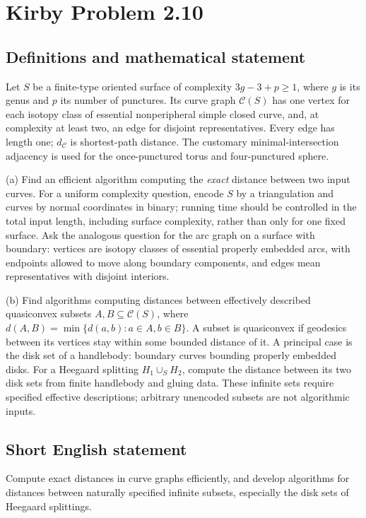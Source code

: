 \documentclass[11pt,a4paper]{article}
\begin{document}
\section*{Kirby Problem 2.10}\label{statement}

\subsection{Definitions and mathematical statement}
Let $S$ be a finite-type oriented surface of complexity $3g-3+p\geq1$, where
$g$ is its genus and $p$ its number of punctures. Its curve graph $\mathcal C(S)$
has one vertex for each isotopy class of essential nonperipheral simple closed
curve, and, at complexity at least two, an edge for disjoint representatives. Every edge
has length one; $d_{\mathcal C}$ is shortest-path distance. The customary
minimal-intersection adjacency is used for the once-punctured torus and
four-punctured sphere.

(a) Find an efficient algorithm computing the \emph{exact} distance between two
input curves. For a uniform complexity question, encode $S$ by a triangulation
and curves by normal coordinates in binary; running time should be controlled
in the total input length, including surface complexity, rather than only for
one fixed surface.
Ask the analogous question for the arc graph on a surface with boundary:
vertices are isotopy classes of essential properly embedded arcs, with
endpoints allowed to move along boundary components, and edges mean
representatives with disjoint interiors.

(b) Find algorithms computing distances between effectively described
quasiconvex subsets $A,B\subseteq\mathcal C(S)$, where
$d(A,B)=\min\{d(a,b):a\in A,b\in B\}$.
A subset is quasiconvex if geodesics between its vertices stay within some
bounded distance of it. A principal case is the disk set of a handlebody:
boundary curves bounding properly embedded disks. For a Heegaard splitting
$H_1\cup_S H_2$, compute the distance between its two disk sets from finite
handlebody and gluing data. These infinite sets require specified effective
descriptions; arbitrary unencoded subsets are not algorithmic inputs.
\subsection{Short English statement}
Compute exact distances in curve graphs efficiently, and develop algorithms for distances between naturally specified infinite subsets, especially the disk sets of Heegaard splittings.
\end{document}
